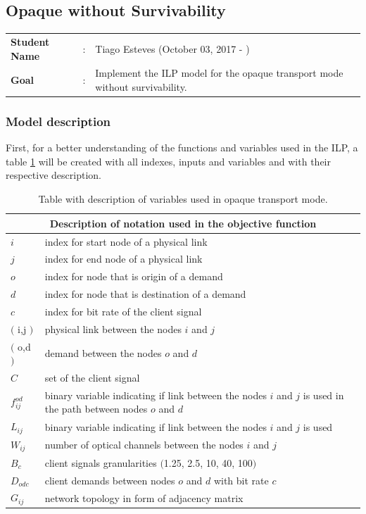 \clearpage

\subsection{Opaque without Survivability}\label{ILP_Opaque_Survivability}
\begin{tcolorbox}	
\begin{tabular}{p{2.75cm} p{0.2cm} p{10.5cm}} 	
\textbf{Student Name}  &:& Tiago Esteves    (October 03, 2017 - )\\
\textbf{Goal}          &:& Implement the ILP model for the opaque transport mode without survivability.
\end{tabular}
\end{tcolorbox}

\subsubsection{Model description}

First, for a better understanding of the functions and variables used in the ILP, a table \ref{description_opaque} will be created with all indexes, inputs and variables and with their respective description.\\

\begin{table}[h!]
\centering
\begin{tabular}{ |p{1cm}||p{13cm}|}
 \hline
 \multicolumn{2}{|c|}{Description of notation used in the objective function} \\
 \hline
 \hline
 $i$ & index for start node of a physical link \\
 $j$ & index for end node of a physical link \\
 $o$ & index for node that is origin of a demand \\
 $d$ & index for node that is destination of a demand \\
 $c$ & index for bit rate of the client signal \\
 $($ i,j $)$ & physical link between the nodes $i$ and $j$ \\
 $($ o,d $)$ & demand between the nodes $o$ and $d$ \\
 $C$ & set of the client signal \\
 $f_{ij}^{od}$ & binary variable indicating if link between the nodes $i$ and $j$ is used in the path between nodes $o$ and $d$ \\
 $L_{ij}$ & binary variable indicating if link between the nodes $i$ and $j$ is used \\
 $W_{ij}$ & number of optical channels between the nodes $i$ and $j$\\
 $B_c $ & client signals granularities $($1.25, 2.5, 10, 40, 100$)$ \\
 $D_{odc}$ & client demands between nodes $o$ and $d$ with bit rate $c$\\
 $G_{ij}$ & network topology in form of adjacency matrix \\
 \hline
\end{tabular}
\caption{Table with description of variables used in opaque transport mode.}
\label{description_opaque}
\end{table}

